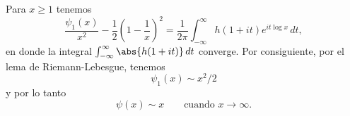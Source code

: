     \begin{teorema}\label{teo:13-9}
        Para $x\geq1$ tenemos
        \begin{equation*}
            \frac{\psi_1(x)}{x^2}-\frac{1}{2}\left(1-\frac{1}{x}\right)^2=\frac{1}{2\pi}\int_{-\infty}^{\infty}h(1+it)e^{it\log x}\,dt,
        \end{equation*}
        en donde la integral $\int_{-\infty}^{\infty}\abs{h(1+it)}\,dt$ converge. Por
        consiguiente, por el lema de Riemann-Lebesgue, tenemos
        \begin{equation}\label{eq:13-24}
            \psi_1(x)\sim x^2/2
        \end{equation}
        y por lo tanto
        \begin{equation*}
            \psi(x)\sim x\qquad\text{cuando }x\to\infty.
        \end{equation*}
    \end{teorema}

